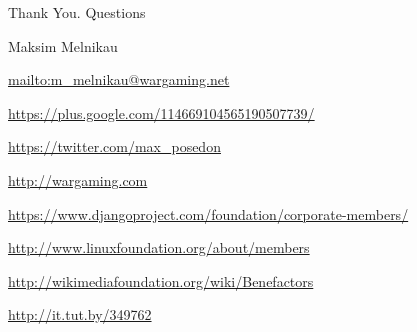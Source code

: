 \documentclass[aspectratio=169]{beamer}
\begin{document}
{


\begin{frame}{Thank You. Questions}
    \begin{block}{Maksim Melnikau}
    \par \url{mailto:m\_melnikau@wargaming.net}
    \par \url{https://plus.google.com/114669104565190507739/}
    \par \url{https://twitter.com/max\_posedon}
    \par \url{http://wargaming.com}
    \par \url{https://www.djangoproject.com/foundation/corporate-members/}
    \par \url{http://www.linuxfoundation.org/about/members}
    \par \url{http://wikimediafoundation.org/wiki/Benefactors}
    \par \url{http://it.tut.by/349762}
    \end{block}
\end{frame}
}
\end{document}

